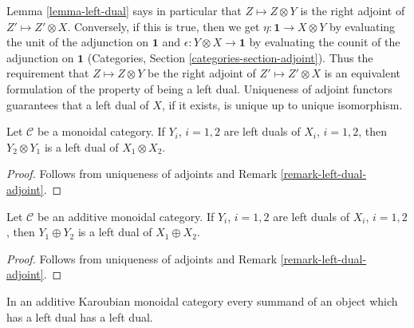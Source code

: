 \begin{remark}
\label{remark-left-dual-adjoint}
Lemma \ref{lemma-left-dual} says in particular that $Z \mapsto Z \otimes Y$
is the right adjoint of $Z' \mapsto Z' \otimes X$. Conversely, if this is
true, then we get $\eta : \mathbf{1} \to X \otimes Y$ by evaluating
the unit of the adjunction on $\mathbf{1}$
and $\epsilon : Y \otimes X \to \mathbf{1}$ by evaluating the counit
of the adjunction on $\mathbf{1}$
(Categories, Section \ref{categories-section-adjoint}). Thus the
requirement that $Z \mapsto Z \otimes Y$ be the right adjoint of
$Z' \mapsto Z' \otimes X$ is an equivalent formulation of the
property of being a left dual. Uniqueness of adjoint functors
guarantees that a left dual of $X$, if it exists, is unique up
to unique isomorphism.
\end{remark}

\begin{lemma}
\label{lemma-tensor-dual}
Let $\mathcal{C}$ be a monoidal category. If $Y_i$, $i = 1, 2$
are left duals of $X_i$, $i = 1, 2$, then $Y_2 \otimes Y_1$ is
a left dual of $X_1 \otimes X_2$.
\end{lemma}

\begin{proof}
Follows from uniqueness of adjoints and Remark \ref{remark-left-dual-adjoint}.
\end{proof}

\begin{lemma}
\label{lemma-additive-dual}
Let $\mathcal{C}$ be an additive monoidal category.
If $Y_i$, $i = 1, 2$ are left duals of $X_i$, $i = 1, 2$, then
$Y_1 \oplus Y_2$ is a left dual of $X_1 \oplus X_2$.
\end{lemma}

\begin{proof}
Follows from uniqueness of adjoints and Remark \ref{remark-left-dual-adjoint}.
\end{proof}

\begin{lemma}
\label{lemma-Karoubian-dual}
In an additive Karoubian monoidal category every summand
of an object which has a left dual has a left dual.
\end{lemma}

